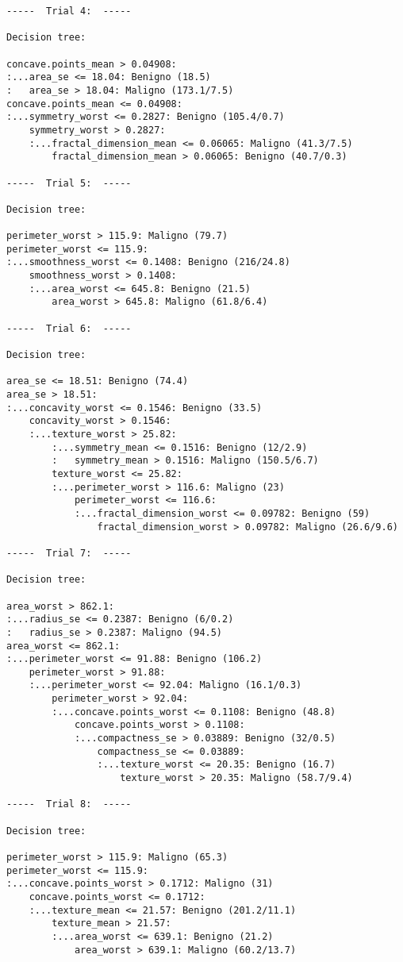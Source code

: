 \documentclass[
]{article}
\begin{document}
\begin{verbatim}
-----  Trial 4:  -----

Decision tree:

concave.points_mean > 0.04908:
:...area_se <= 18.04: Benigno (18.5)
:   area_se > 18.04: Maligno (173.1/7.5)
concave.points_mean <= 0.04908:
:...symmetry_worst <= 0.2827: Benigno (105.4/0.7)
    symmetry_worst > 0.2827:
    :...fractal_dimension_mean <= 0.06065: Maligno (41.3/7.5)
        fractal_dimension_mean > 0.06065: Benigno (40.7/0.3)

-----  Trial 5:  -----

Decision tree:

perimeter_worst > 115.9: Maligno (79.7)
perimeter_worst <= 115.9:
:...smoothness_worst <= 0.1408: Benigno (216/24.8)
    smoothness_worst > 0.1408:
    :...area_worst <= 645.8: Benigno (21.5)
        area_worst > 645.8: Maligno (61.8/6.4)

-----  Trial 6:  -----

Decision tree:

area_se <= 18.51: Benigno (74.4)
area_se > 18.51:
:...concavity_worst <= 0.1546: Benigno (33.5)
    concavity_worst > 0.1546:
    :...texture_worst > 25.82:
        :...symmetry_mean <= 0.1516: Benigno (12/2.9)
        :   symmetry_mean > 0.1516: Maligno (150.5/6.7)
        texture_worst <= 25.82:
        :...perimeter_worst > 116.6: Maligno (23)
            perimeter_worst <= 116.6:
            :...fractal_dimension_worst <= 0.09782: Benigno (59)
                fractal_dimension_worst > 0.09782: Maligno (26.6/9.6)

-----  Trial 7:  -----

Decision tree:

area_worst > 862.1:
:...radius_se <= 0.2387: Benigno (6/0.2)
:   radius_se > 0.2387: Maligno (94.5)
area_worst <= 862.1:
:...perimeter_worst <= 91.88: Benigno (106.2)
    perimeter_worst > 91.88:
    :...perimeter_worst <= 92.04: Maligno (16.1/0.3)
        perimeter_worst > 92.04:
        :...concave.points_worst <= 0.1108: Benigno (48.8)
            concave.points_worst > 0.1108:
            :...compactness_se > 0.03889: Benigno (32/0.5)
                compactness_se <= 0.03889:
                :...texture_worst <= 20.35: Benigno (16.7)
                    texture_worst > 20.35: Maligno (58.7/9.4)

-----  Trial 8:  -----

Decision tree:

perimeter_worst > 115.9: Maligno (65.3)
perimeter_worst <= 115.9:
:...concave.points_worst > 0.1712: Maligno (31)
    concave.points_worst <= 0.1712:
    :...texture_mean <= 21.57: Benigno (201.2/11.1)
        texture_mean > 21.57:
        :...area_worst <= 639.1: Benigno (21.2)
            area_worst > 639.1: Maligno (60.2/13.7)


\end{verbatim}
\end{document}
